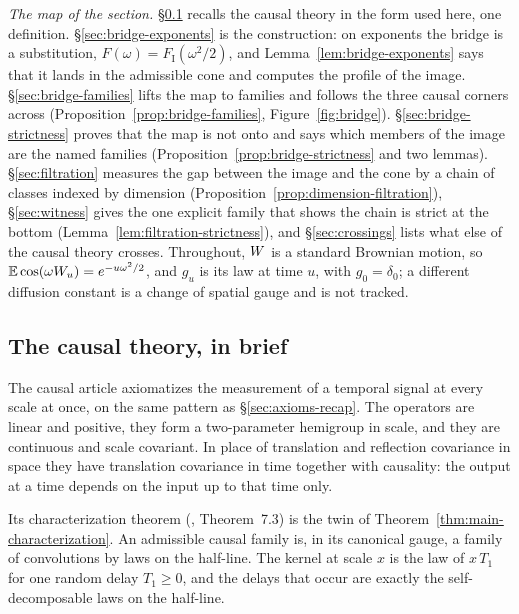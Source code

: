 \emph{The map of the section.} \S\ref{sec:causal-brief} recalls the causal theory in the form
used here, one definition. \S\ref{sec:bridge-exponents} is the construction: on exponents the
bridge is a substitution, $F(\omega) = F_{\mathrm I}(\omega^2/2)$, and Lemma~\ref{lem:bridge-exponents}
says that it lands in the admissible cone and computes the profile of the image.
\S\ref{sec:bridge-families} lifts the map to families and follows the three causal corners
across (Proposition~\ref{prop:bridge-families}, Figure~\ref{fig:bridge}).
\S\ref{sec:bridge-strictness} proves that the map is not onto and says which members of the
image are the named families (Proposition~\ref{prop:bridge-strictness} and two lemmas).
\S\ref{sec:filtration} measures the gap between the image and the cone by a chain of classes
indexed by dimension (Proposition~\ref{prop:dimension-filtration}), \S\ref{sec:witness} gives
the one explicit family that shows the chain is strict at the bottom
(Lemma~\ref{lem:filtration-strictness}), and \S\ref{sec:crossings} lists what else of the causal
theory crosses. Throughout, $W$ is a standard Brownian motion, so
$\mathbb{E}\cos(\omega W_u) = e^{-u\omega^2/2}$, and $g_u$ is its law at time $u$, with
$g_0 = \delta_0$; a different diffusion constant is a change of spatial gauge and is not tracked.

\subsection{The causal theory, in brief}\label{sec:causal-brief}

The causal article axiomatizes the measurement of a temporal signal at every scale at once, on
the same pattern as \S\ref{sec:axioms-recap}. The operators are linear and positive, they form
a two-parameter hemigroup in scale, and they are continuous and scale covariant. In place of
translation and reflection covariance in space they have translation covariance in time
together with causality: the output at a time depends on the input up to that time only.

Its characterization theorem (, Theorem~7.3) is the twin of
Theorem~\ref{thm:main-characterization}. An admissible causal family is, in its canonical
gauge, a family of convolutions by laws on the half-line. The kernel at scale $x$ is the law
of $x\,T_1$ for one random delay $T_1 \ge 0$, and the delays that occur are exactly the
self-decomposable laws on the half-line.

